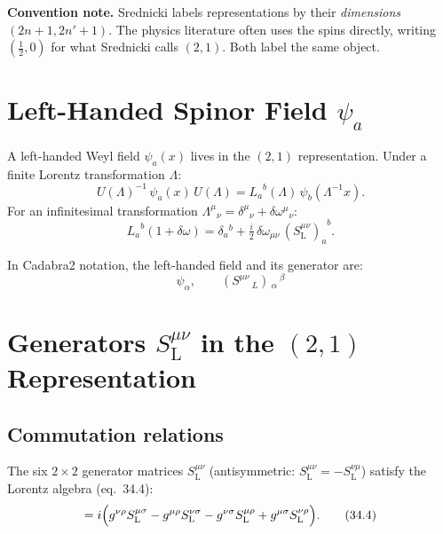 \noindent\textbf{Convention note.}  Srednicki labels representations by their
\emph{dimensions} $(2n{+}1, 2n'{+}1)$.  The physics literature often uses
the spins directly, writing $(\tfrac{1}{2},0)$ for what Srednicki calls $(2,1)$.
Both label the same object.

\section{Left-Handed Spinor Field \texorpdfstring{$\psi_a$}{psi\_a}}

A left-handed Weyl field $\psi_a(x)$ lives in the $(2,1)$ representation.
Under a finite Lorentz transformation $\Lambda$:
\begin{equation}
  U(\Lambda)^{-1}\,\psi_a(x)\,U(\Lambda)
  = {L_a}^b(\Lambda)\,\psi_b(\Lambda^{-1}x).
  \tag{34.1}
\end{equation}
For an infinitesimal transformation
${\Lambda^\mu}{}_\nu = \delta^\mu{}_\nu + \delta\omega^\mu{}_\nu$:
\begin{equation}
  {L_a}^b(1{+}\delta\omega)
  = \delta_a{}^b + \tfrac{i}{2}\,\delta\omega_{\mu\nu}\,
    {(S^{\mu\nu}_{\mathrm{L}})_a}^b.
  \tag{34.3}
\end{equation}

\noindent In Cadabra2 notation, the left-handed field and its generator are:
\[
  \psi_{\alpha},
  \qquad
  \left(S^{\mu \nu}\,_{L} \right)\,_{\alpha}\,^{\beta}
\]

\section{Generators \texorpdfstring{$S^{\mu\nu}_{\mathrm{L}}$}{S\^{}munu\_L}
         in the $(2,1)$ Representation}

\subsection{Commutation relations}

The six $2\times 2$ generator matrices $S^{\mu\nu}_{\mathrm{L}}$
(antisymmetric: $S^{\mu\nu}_{\mathrm{L}} = -S^{\nu\mu}_{\mathrm{L}}$)
satisfy the Lorentz algebra (eq.~34.4):
\begin{equation}
  [S^{\mu\nu}_{\mathrm{L}},\, S^{\rho\sigma}_{\mathrm{L}}]
  = i\Bigl(
      g^{\nu\rho} S^{\mu\sigma}_{\mathrm{L}}
    - g^{\mu\rho} S^{\nu\sigma}_{\mathrm{L}}
    - g^{\nu\sigma} S^{\mu\rho}_{\mathrm{L}}
    + g^{\mu\sigma} S^{\nu\rho}_{\mathrm{L}}
    \Bigr).
  \tag{34.4}
\end{equation}

